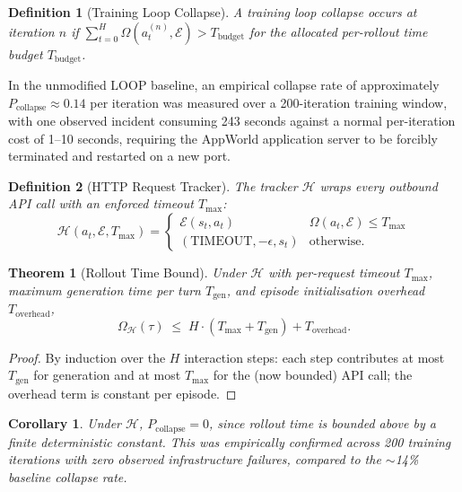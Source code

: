 \documentclass[11pt]{article}
\newtheorem{definition}{Definition}
\newtheorem{theorem}{Theorem}
\newtheorem{corollary}{Corollary}
\begin{document}
\begin{definition}[Training Loop Collapse]
A training loop collapse occurs at iteration $n$ if
$\sum_{t=0}^{H} \Omega(a_t^{(n)}, \mathcal{E}) > T_{\mathrm{budget}}$
for the allocated per-rollout time budget $T_{\mathrm{budget}}$.
\end{definition}

In the unmodified LOOP baseline, an empirical collapse rate of approximately
$P_{\mathrm{collapse}} \approx 0.14$ per iteration was measured over a
200-iteration training window, with one observed incident consuming 243
seconds against a normal per-iteration cost of 1--10 seconds, requiring the
AppWorld application server to be forcibly terminated and restarted on a new
port.

\begin{definition}[HTTP Request Tracker]
The tracker $\mathcal{H}$ wraps every outbound API call with an enforced
timeout $T_{\max}$:
\begin{equation}
\mathcal{H}(a_t, \mathcal{E}, T_{\max}) = \begin{cases}
\mathcal{E}(s_t, a_t) & \Omega(a_t, \mathcal{E}) \leq T_{\max} \\
(\mathrm{TIMEOUT}, -\epsilon, s_t) & \text{otherwise.}
\end{cases}
\end{equation}
\end{definition}

\begin{theorem}[Rollout Time Bound]
\label{thm:safety}
Under $\mathcal{H}$ with per-request timeout $T_{\max}$, maximum generation
time per turn $T_{\mathrm{gen}}$, and episode initialisation overhead
$T_{\mathrm{overhead}}$,
\begin{equation}
\Omega_\mathcal{H}(\tau) \;\leq\; H \cdot (T_{\max} + T_{\mathrm{gen}}) + T_{\mathrm{overhead}}.
\end{equation}
\end{theorem}

\begin{proof}
By induction over the $H$ interaction steps: each step contributes at most
$T_{\mathrm{gen}}$ for generation and at most $T_{\max}$ for the (now bounded)
API call; the overhead term is constant per episode.
\end{proof}

\begin{corollary}
Under $\mathcal{H}$, $P_{\mathrm{collapse}} = 0$, since rollout time is bounded
above by a finite deterministic constant. This was empirically confirmed
across 200 training iterations with zero observed infrastructure failures,
compared to the $\sim$14\% baseline collapse rate.
\end{corollary}
\end{document}
